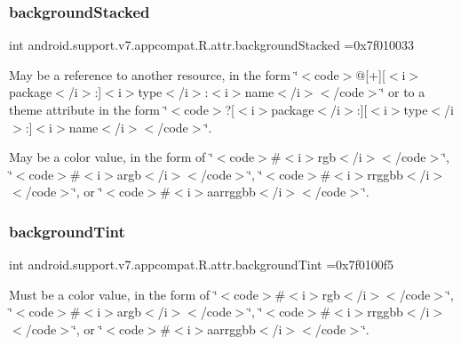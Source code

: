 \subsubsection{\texorpdfstring{background\+Stacked}{backgroundStacked}}
{\footnotesize\ttfamily int android.\+support.\+v7.\+appcompat.\+R.\+attr.\+background\+Stacked =0x7f010033\hspace{0.3cm}{\ttfamily [static]}}

May be a reference to another resource, in the form \char`\"{}$<$code$>$@\mbox{[}+\mbox{]}\mbox{[}$<$i$>$package$<$/i$>$\+:\mbox{]}$<$i$>$type$<$/i$>$\+:$<$i$>$name$<$/i$>$$<$/code$>$\char`\"{} or to a theme attribute in the form \char`\"{}$<$code$>$?\mbox{[}$<$i$>$package$<$/i$>$\+:\mbox{]}\mbox{[}$<$i$>$type$<$/i$>$\+:\mbox{]}$<$i$>$name$<$/i$>$$<$/code$>$\char`\"{}. 

May be a color value, in the form of \char`\"{}$<$code$>$\#$<$i$>$rgb$<$/i$>$$<$/code$>$\char`\"{}, \char`\"{}$<$code$>$\#$<$i$>$argb$<$/i$>$$<$/code$>$\char`\"{}, \char`\"{}$<$code$>$\#$<$i$>$rrggbb$<$/i$>$$<$/code$>$\char`\"{}, or \char`\"{}$<$code$>$\#$<$i$>$aarrggbb$<$/i$>$$<$/code$>$\char`\"{}. \mbox{\label{classandroid_1_1support_1_1v7_1_1appcompat_1_1R_1_1attr_a6bf6c479f7c0fccd735ef4b8cd293ceb}} 
\subsubsection{\texorpdfstring{background\+Tint}{backgroundTint}}
{\footnotesize\ttfamily int android.\+support.\+v7.\+appcompat.\+R.\+attr.\+background\+Tint =0x7f0100f5\hspace{0.3cm}{\ttfamily [static]}}

Must be a color value, in the form of \char`\"{}$<$code$>$\#$<$i$>$rgb$<$/i$>$$<$/code$>$\char`\"{}, \char`\"{}$<$code$>$\#$<$i$>$argb$<$/i$>$$<$/code$>$\char`\"{}, \char`\"{}$<$code$>$\#$<$i$>$rrggbb$<$/i$>$$<$/code$>$\char`\"{}, or \char`\"{}$<$code$>$\#$<$i$>$aarrggbb$<$/i$>$$<$/code$>$\char`\"{}. 

